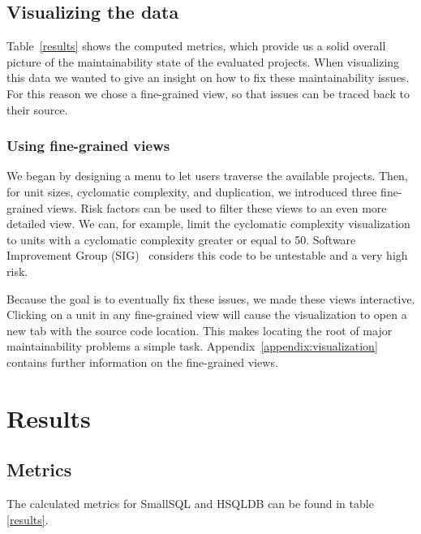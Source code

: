 \documentclass{article}
\begin{document}
\subsection{Visualizing the data}
Table~\ref{results} shows the computed metrics, which provide us a solid overall picture of the maintainability state of the evaluated projects.
When visualizing this data we wanted to give an insight on how to fix these maintainability issues. 
For this reason we chose a fine-grained view, so that issues can be traced back to their source.

\subsubsection{Using fine-grained views}
We began by designing a menu to let users traverse the available projects.
Then, for unit sizes, cyclomatic complexity, and duplication, we introduced three fine-grained views.
Risk factors can be used to filter these views to an even more detailed view.
We can, for example, limit the cyclomatic complexity visualization to units with a cyclomatic complexity greater or equal to 50.
Software Improvement Group (SIG)~\cite{SIG} considers this code to be untestable and a very high risk.

Because the goal is to eventually fix these issues, we made these views interactive.
Clicking on a unit in any fine-grained view will cause the visualization to open a new tab with the source code location.
This makes locating the root of major maintainability problems a simple task.
Appendix~\ref{appendix:visualization} contains further information on the fine-grained views.

\section{Results}

\subsection{Metrics}
The calculated metrics for SmallSQL and HSQLDB can be found in table \ref{results}.
\end{document}
